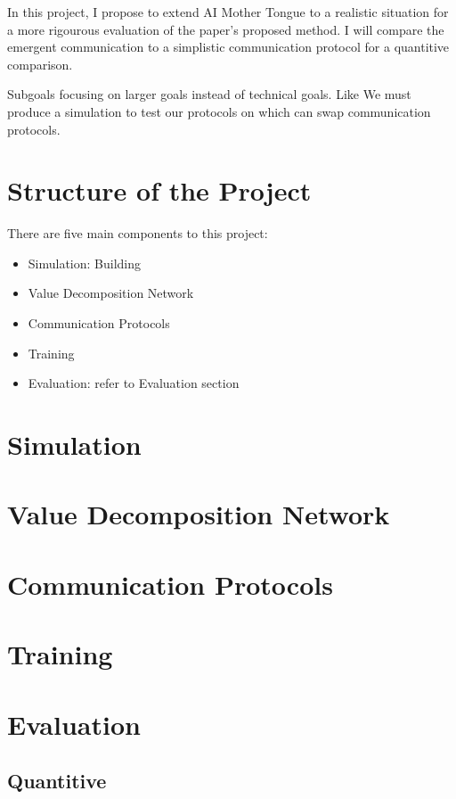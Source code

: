 \documentclass[20pt]{article}
\begin{document}
In this project, I propose to extend AI Mother Tongue to a realistic situation for a more rigourous evaluation of the paper's proposed method. I will compare the emergent communication to a simplistic communication protocol for a quantitive comparison.


Subgoals focusing on larger goals instead of technical goals. Like We must produce a simulation to test our protocols on which can swap communication protocols.



\pagebreak
\section{Structure of the Project}
There are five main components to this project:

\begin{itemize}
\item Simulation: Building 
\item Value Decomposition Network
\item Communication Protocols
\item Training
\item Evaluation: refer to Evaluation section
\end{itemize}

\section*{Simulation}


\section*{Value Decomposition Network}

\section*{Communication Protocols}

\section*{Training}


\section{Evaluation}

\subsection*{Quantitive}
\end{document}

